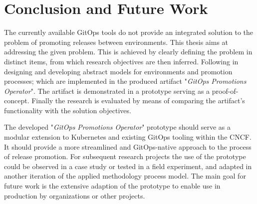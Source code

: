 \chapter{Conclusion and Future Work}

%
%
%
%

\noindent
The currently available GitOps tools
do not provide an integrated solution to
the problem of promoting releases between environments.
This thesis aims at addressing the given problem.
This is achieved by
clearly defining the problem in distinct items,
from which research objectives are then inferred.
Following in designing and developing abstract models for
environments and promotion processes;
which are implemented in the produced artifact "\textit{GitOps Promotions Operator}".
The artifact is demonstrated in a prototype serving as a proof-of-concept.
Finally the research is evaluated by means of
comparing the artifact's functionality with the solution objectives.
\bigskip

\noindent
The developed "\textit{GitOps Promotions Operator}" prototype should serve as
a modular extension to Kubernetes and existing GitOps tooling within the CNCF.
It should provide a more streamlined and GitOps-native approach
to the process of release promotion.
For subsequent research projects the use of the prototype could
be observed in a case study or tested in a field experiment,
and adapted in another iteration of the applied methodology process model.
The main goal for future work is the extensive adaption of the prototype
to enable use in production by organizations or other projects.






















